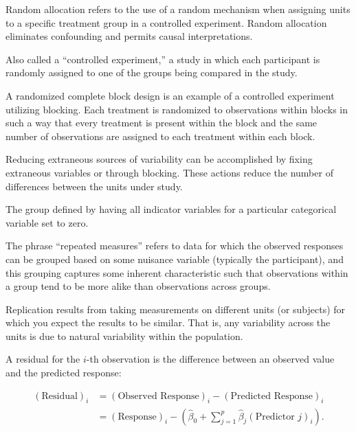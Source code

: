 \documentclass[
  letterpaper,
  DIV=11,
  numbers=noendperiod]{scrreprt}
\providecommand{\tightlist}{%
  \setlength{\itemsep}{0pt}\setlength{\parskip}{0pt}}\usepackage{longtable,booktabs,array}
\theoremstyle{definition}
\theoremstyle{definition}
\theoremstyle{remark}
\begin{document}
Random allocation refers to the use of a random mechanism when assigning
units to a specific treatment group in a controlled experiment. Random
allocation eliminates confounding and permits causal interpretations.

\begin{description}
\tightlist
\item[Randomized Clinical Trial
(Definition~\ref{def-randomized-clinical-trial})]
Also called a ``controlled experiment,'' a study in which each
participant is randomly assigned to one of the groups being compared in
the study.
\item[Randomized Complete Block Design (Definition~\ref{def-rcbd})]
A randomized complete block design is an example of a controlled
experiment utilizing blocking. Each treatment is randomized to
observations within blocks in such a way that every treatment is present
within the block and the same number of observations are assigned to
each treatment within each block.
\item[Reduction of Noise (Definition~\ref{def-noise-reduction})]
Reducing extraneous sources of variability can be accomplished by fixing
extraneous variables or through blocking. These actions reduce the
number of differences between the units under study.
\item[Reference Group (Definition~\ref{def-reference-group})]
The group defined by having all indicator variables for a particular
categorical variable set to zero.
\item[Repeated Measures (Definition~\ref{def-repeated-measures})]
The phrase ``repeated measures'' refers to data for which the observed
responses can be grouped based on some nuisance variable (typically the
participant), and this grouping captures some inherent characteristic
such that observations within a group tend to be more alike than
observations across groups.
\item[Replication (Definition~\ref{def-replication})]
Replication results from taking measurements on different units (or
subjects) for which you expect the results to be similar. That is, any
variability across the units is due to natural variability within the
population.
\item[Residual (Definition~\ref{def-residual})]
A residual for the \(i\)-th observation is the difference between an
observed value and the predicted response:
\end{description}

\[
\begin{aligned}
  (\text{Residual})_i 
    &= (\text{Observed Response})_i - (\text{Predicted Response})_i \\
    &= (\text{Response})_i - \left(\widehat{\beta}_0 + \sum_{j=1}^{p} \widehat{\beta}_j (\text{Predictor } j)_i\right).
\end{aligned}
\]
\end{document}
